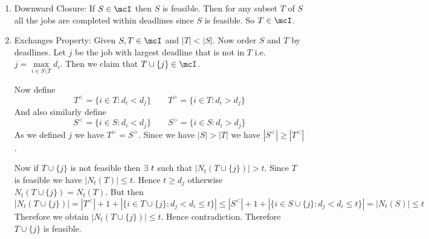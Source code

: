 \begin{alternate-proof}
	\begin{enumerate}[label=\bfseries\tiny\protect\circled{\small\arabic*}]
		\item Downward Closure: If $S\in\mcI$ then $S$ is feasible. Then for any subset $T$ of $S$ all the jobs are completed within deadlines since $S$ is feasible. So $T\in \mcI$.
		\item Exchanges Property: Given $S,T\in\mcI$ and $|T|<|S|$. Now order $S$ and $T$ by deadlines. Let $j$ be the job with largest deadline that is not in $T$ i.e. $j=\underset{i\in S\setminus T}{\max}d_i$. Then we claim that $T\cup \{j\}\in\mcI$. \parinn
		
		Now define $$T^<=\{i\in T\colon d_i<d_j\}\qquad T^>=\{i\in T\colon d_i>d_j\}$$And also similarly define$$S^<=\{i\in S\colon d_i<d_j\}\qquad S^>=\{i\in S\colon d_i>d_j\}$$As we defined $j$ we have $T^>=S^>$. Since we have $|S|>|T|$ we have $|S^<|\geq |T^<|$.  
		
		Now if $T\cup \{j\}$ is not feasible then $\exists\ t$ such that $|N_t(T\cup \{j\})|>t$. Since $T$ is feasible we have $|N_t(T)|\leq t$. Hence $t\geq d_j$ otherwise $N_t(T\cup \{j\})=N_t(T)$. But then $$|N_t(T\cup \{j\})|=|T^<|+1+|\{i\in T\cup \{j\}\colon d_j<d_i\leq t\}|\leq |S^<|+1+|\{i\in S\cup \{j\}\colon d_j<d_i\leq t\}|=|N_t(S)|\leq t$$Therefore we obtain $|N_t(T\cup \{j\})|\leq t$. Hence contradiction. Therefore $T\cup \{j\}$ is feasible.
	\end{enumerate}
\end{alternate-proof}


